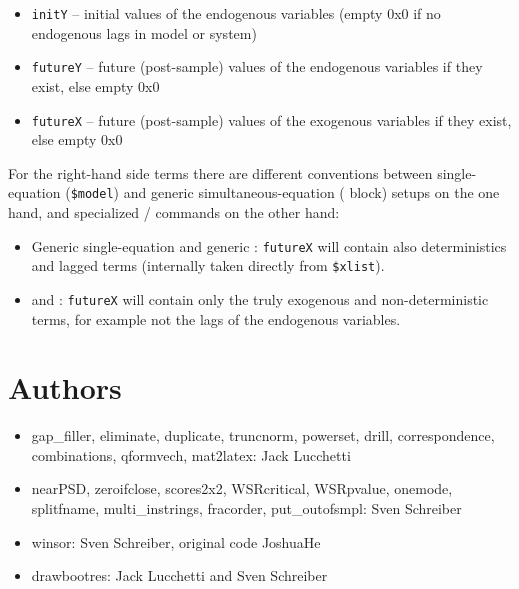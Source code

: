 \documentclass[11pt,english]{article}
\begin{document}
\begin{itemize}
\item \texttt{initY} -- initial values of the endogenous variables
  (empty 0x0 if no endogenous lags in model or system)
\item \texttt{futureY} -- future (post-sample) values of the endogenous
  variables if they exist, else empty 0x0
\item \texttt{futureX} -- future (post-sample) values of the exogenous
  variables if they exist, else empty 0x0
\end{itemize}

For the right-hand side terms there are different conventions between
single-equation (\texttt{\$model}) and generic simultaneous-equation
( block) setups on the one hand, and specialized   /
 commands on the other hand:
 
\begin{itemize}
\item Generic single-equation and generic : 
  \texttt{futureX} will contain also deterministics and lagged terms 
  (internally taken directly from \texttt{\$xlist}).
 
\item {} and : 
  \texttt{futureX} will contain only the truly exogenous and 
   non-deterministic terms, for example not the lags of the 
   endogenous variables.
\end{itemize}

\section{Authors}
\begin{itemize}
\item gap\_filler, eliminate, duplicate, truncnorm, powerset,
  drill, correspondence, combinations, qformvech, mat2latex: Jack Lucchetti

\item nearPSD, zeroifclose, scores2x2, WSRcritical, WSRpvalue, onemode,
splitfname, multi\_instrings, fracorder, put\_outofsmpl:
Sven Schreiber

\item winsor: Sven Schreiber, original code JoshuaHe

\item drawbootres: Jack Lucchetti and Sven Schreiber

\end{itemize}
\end{document}
